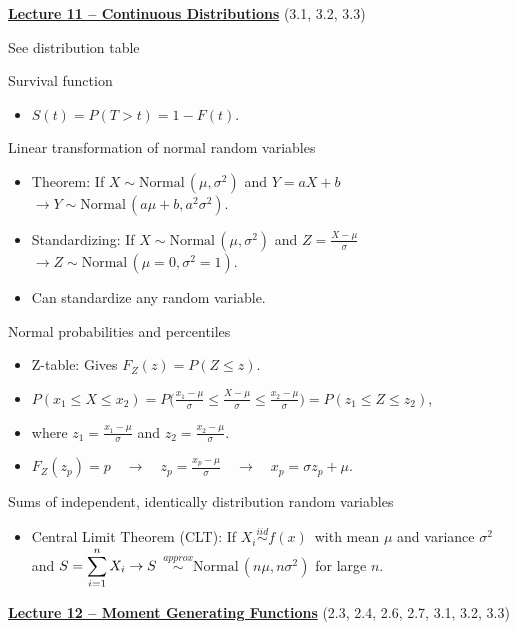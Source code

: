 \documentclass{article}
\newcommand{\bu}[1]{\textbf{\ul{#1}}}				%
\newcommand{\followsp}[2]{\overset{#1}\sim \text{#2}\,}		%
\begin{document}
{\large \bu{Lecture 11 -- Continuous Distributions}} (3.1, 3.2, 3.3)\bigskip

See distribution table\bigskip

Survival function
\begin{itemize}
    \item $S(t) = P(T > t) = 1 - F(t)$.
\end{itemize}\bigskip

Linear transformation of normal random variables 
\begin{itemize}
    \item Theorem: If $X \sim \text{Normal}\,(\mu, \sigma^2)$ and $Y = aX + b$ $\rightarrow Y \sim \text{Normal}\,(a\mu + b, a^2\sigma^2)$.
    \item Standardizing: If $X \sim \text{Normal}\,(\mu, \sigma^2)$ and $Z = \frac{X -\mu}{\sigma}$ $\rightarrow Z \sim \text{Normal}\,(\mu = 0,\sigma^2 = 1)$.
    \item Can standardize any random variable.
\end{itemize}\bigskip

Normal probabilities and percentiles
\begin{itemize}
    \item Z-table: Gives $F_Z(z) = P(Z \le z)$.
    \item $P(x_1 \le X \le x_2) = P\Big(\frac{x_1 - \mu}{\sigma} \le \frac{X - \mu}{\sigma} \le \frac{x_2 - \mu}{\sigma}\Big) = P(z_1 \le Z \le z_2)$,
    \item[] where $z_1 = \frac{x_1 - \mu}{\sigma}$ and $\displaystyle z_2 = \frac{x_2 - \mu}{\sigma}$.
    \item $F_Z(z_p) = p \quad \rightarrow \quad z_p = \frac{x_p - \mu}{\sigma} \quad \rightarrow \quad x_p = \sigma z_p + \mu$.
\end{itemize}\bigskip

Sums of independent, identically distribution random variables
\begin{itemize}
    \item Central Limit Theorem (CLT): If $X_i \followsp{iid}{$f(x)$}$ with mean $\mu$ and variance $\sigma^2$ and $\displaystyle S = \sum_{i = 1}^n X_i \\ \rightarrow S$ $\followsp{approx}{Normal}(n\mu, n\sigma^2)$ for large $n$.
\end{itemize}

\vspace{50pt}

{\large \bu{Lecture 12 -- Moment Generating Functions}} (2.3, 2.4, 2.6, 2.7, 3.1, 3.2, 3.3)\bigskip
\end{document}
